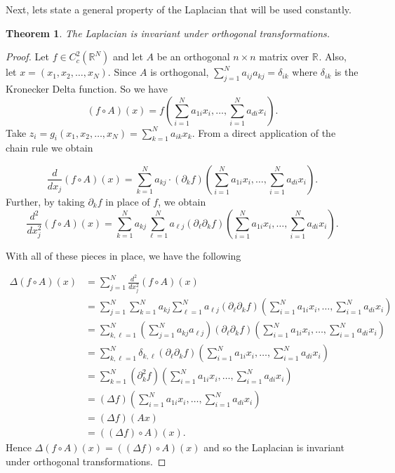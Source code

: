 \documentclass[12pt]{report}
\newtheorem{theorem}{Theorem}[section]
\numberwithin{definition}{section}
\begin{document}
  Next, lets state a general property of the Laplacian that will be used constantly.

\begin{theorem}
  The Laplacian is invariant under orthogonal transformations.
\end{theorem}

\begin{proof}
  Let $f \in C_{c}^2(\mathbb{R}^{N} )$ and let $A$ be an orthogonal $n \times n$ matrix over $\mathbb{R}^{} $.
  Also, let $x = (x_1,x_2,\ldots,x_{N})$.
  Since $A$ is orthogonal, $\sum_{j=1}^N a_{ij}a_{kj} = \delta_{ik}$ where $\delta_{ik}$ is the Kronecker Delta function.
  So we have
  \[
    (f \circ A)(x) = f \left( \sum_{i=1}^{N} a_{1i}x_{i}, \ldots , \sum_{i=1}^{N} a_{di}x_{i} \right )
  .\] 
  Take $z_{i} = g_{i}(x_1,x_2,\ldots,x_{N}) = \sum_{k=1}^{N} a_{ik}x_{k}$.
  From a direct application of the chain rule we obtain

  \[
    \frac{d}{dx_j} (f\circ A)(x) = \sum_{k=1}^N a_{kj} \cdot (\partial_k f)( \sum_{i=1}^N a_{1i} x_i, \dots, \sum_{i=1}^N a_{di} x_i ) 
  .\] 
  Further, by taking $\partial_{k} f$ in place of $f$, we obtain
  \[
  \frac{d^2}{dx_j^2} (f\circ A)(x) = \sum_{k=1}^N a_{kj} \sum_{\ell=1}^N a_{\ell j} (\partial_\ell \partial_k f)( \sum_{i=1}^N a_{1i} x_i, \dots, \sum_{i=1}^N a_{di} x_i )
  .\] 

  With all of these pieces in place, we have the following

\begin{align*}
  \Delta (f\circ A)(x) &= \sum_{j=1}^N \frac{d^2}{dx_j^2} (f\circ A)(x) \\
  &= \sum_{j=1}^N \sum_{k=1}^N a_{kj} \sum_{\ell=1}^N a_{\ell j} (\partial_\ell \partial_k f)( \sum_{i=1}^N a_{1i} x_i, \dots, \sum_{i=1}^N a_{di} x_i ) \\
  &= \sum_{k,\ell=1}^N \left( \sum_{j=1}^N a_{kj} a_{\ell j} \right) (\partial_\ell \partial_k f)( \sum_{i=1}^N a_{1i} x_i, \dots, \sum_{i=1}^N a_{di} x_i ) \\
  &= \sum_{k,\ell=1}^N \delta_{k,\ell} (\partial_\ell \partial_k f)( \sum_{i=1}^N a_{1i} x_i, \dots, \sum_{i=1}^N a_{di} x_i ) \\
  &= \sum_{k=1}^N (\partial_k^2 f)( \sum_{i=1}^N a_{1i} x_i, \dots, \sum_{i=1}^N a_{di} x_i ) \\
  &= (\Delta f) ( \sum_{i=1}^N a_{1i} x_i, \dots, \sum_{i=1}^N a_{di} x_i ) \\
  &= (\Delta f)(Ax) \\
  &= ((\Delta f)\circ A)(x).
\end{align*}
  Hence $\Delta (f\circ A)(x) = ((\Delta f)\circ A)(x)$ and so the Laplacian is invariant under orthogonal transformations.
  
\end{proof}
\end{document}
